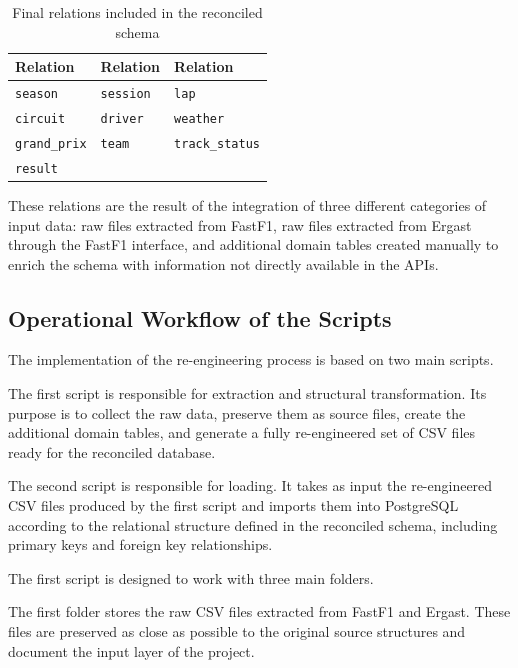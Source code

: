 \documentclass[12pt,a4paper]{article}
\begin{document}
	\begin{table}[H]
		\centering
		\caption{Final relations included in the reconciled schema}
		\renewcommand{\arraystretch}{1.2}
		\begin{tabularx}{0.95\textwidth}{
				>{\raggedright\arraybackslash}X
				>{\raggedright\arraybackslash}X
				>{\raggedright\arraybackslash}X}
			\toprule
			\textbf{Relation} & \textbf{Relation} & \textbf{Relation} \\
			\midrule
			\texttt{season}       & \texttt{session}      & \texttt{lap} \\
			\texttt{circuit}      & \texttt{driver}       & \texttt{weather} \\
			\texttt{grand\_prix}  & \texttt{team}         & \texttt{track\_status} \\
			\texttt{result}       &                       & \\
			\bottomrule
		\end{tabularx}
	\end{table}
	These relations are the result of the integration of three different categories of input data:
	raw files extracted from FastF1, raw files extracted from Ergast through the FastF1 interface, and additional domain tables created manually to enrich the schema with information not directly available in the APIs.
	
	\subsection{Operational Workflow of the Scripts}
	
	The implementation of the re-engineering process is based on two main scripts.
	
	The first script is responsible for extraction and structural transformation.
	Its purpose is to collect the raw data, preserve them as source files, create the additional domain tables, and generate a fully re-engineered set of CSV files ready for the reconciled database.
	
	The second script is responsible for loading.
	It takes as input the re-engineered CSV files produced by the first script and imports them into PostgreSQL according to the relational structure defined in the reconciled schema, including primary keys and foreign key relationships.
	

	The first script is designed to work with three main folders.
	
	The first folder stores the raw CSV files extracted from FastF1 and Ergast.
	These files are preserved as close as possible to the original source structures and document the input layer of the project.
	
\end{document}
